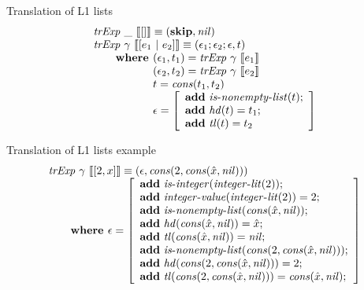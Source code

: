 \documentclass{beamer}
\begin{document}
  \begin{frame}{Translation of L1 lists}
    \[
      \begin{array}{l}
      \trExp{\_}{[]} \equiv (
        \skipE, \mathit{nil}
      )\\
      \trExp{\gamma}{[e_1~|~e_2]} \equiv (\epsilon_1;\epsilon_2;\epsilon, t)\\
        \qquad \textbf{where } (\epsilon_1, t_1) = \trExp{\gamma}{e_1}\\ 
        \qquad \phantom{\textbf{where }} (\epsilon_2, t_2) = \trExp{\gamma}{e_2}\\ 
        \qquad \phantom{\textbf{where }} t = \mathit{cons}(t_1, t_2)\\ 
        \qquad \phantom{\textbf{where }} \epsilon = \left[
          \begin{array}{l}
            \addE~\isnelist{t};\\
            \addE~\mathit{hd}(t) = t_1;\\
            \addE~\mathit{tl}(t) = t_2\\
          \end{array}
        \right]
      \end{array}
    \]
  \end{frame}
  \begin{frame}{Translation of L1 lists example}
    \[
      \begin{array}{l}
      \mathit{trExp}~\gamma~\llbracket[2, x]\rrbracket \equiv (\epsilon, \mathit{cons}(2, \mathit{cons}(\hat{x}, \mathit{nil})))\\
      \qquad \textbf{where } \epsilon = \left[ 
      \begin{array}{l}
      \textbf{add}~\mathit{is\mbox{-}integer}(\mathit{integer\mbox{-}lit}(2));\\
      \textbf{add}~\mathit{integer\mbox{-}value}(\mathit{integer\mbox{-}lit}(2)) = 2;\\
      \textbf{add}~\mathit{is\mbox{-}nonempty\mbox{-}list}(\mathit{cons}(\hat{x}, \mathit{nil}));\\
      \textbf{add}~\mathit{hd}(\mathit{cons}(\hat{x}, \mathit{nil})) = \hat{x};\\
      \textbf{add}~\mathit{tl}(\mathit{cons}(\hat{x}, \mathit{nil})) = \mathit{nil};\\
      \textbf{add}~\mathit{is\mbox{-}nonempty\mbox{-}list}(\mathit{cons}(2, \mathit{cons}(\hat{x}, \mathit{nil})));\\
      \textbf{add}~\mathit{hd}(\mathit{cons}(2, \mathit{cons}(\hat{x}, \mathit{nil}))) = 2;\\
      \textbf{add}~\mathit{tl}(\mathit{cons}(2, \mathit{cons}(\hat{x}, \mathit{nil}))) = \mathit{cons}(\hat{x}, \mathit{nil});\\
      \end{array}
      \right]
      \end{array}
    \]
  \end{frame}
\end{document}
